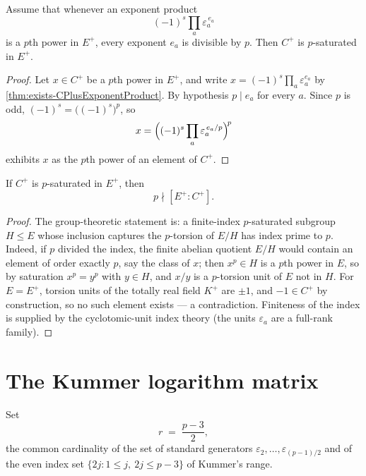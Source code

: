\begin{theorem}\label{thm:CPlus-pSaturated-exponents}
  \leanok
Assume that whenever an exponent product
\[
  (-1)^s\prod_a\varepsilon_a^{\,e_a}
\]
is a $p$th power in $E^+$, every exponent $e_a$ is divisible by $p$.  Then
$C^+$ is $p$-saturated in $E^+$.
\end{theorem}
\begin{proof}\leanok
Let $x \in C^+$ be a $p$th power in $E^+$, and write $x = (-1)^s \prod_a
\varepsilon_a^{e_a}$ by \cref{thm:exists-CPlusExponentProduct}.  By
hypothesis $p \mid e_a$ for every $a$.  Since $p$ is odd, $(-1)^s =
\bigl((-1)^s\bigr)^p$, so
\[
  x = \Bigl((-1)^s\prod_a\varepsilon_a^{\,e_a/p}\Bigr)^{\!p}
\]
exhibits $x$ as the $p$th power of an element of $C^+$.
\end{proof}

\begin{theorem}\label{thm:not-dvd-index-of-pSaturated}
  \leanok
If $C^+$ is $p$-saturated in $E^+$, then
\[
  p\nmid[E^+:C^+].
\]
\end{theorem}
\begin{proof}\leanok
The group-theoretic statement is: a finite-index $p$-saturated subgroup $H
\le E$ whose inclusion captures the $p$-torsion of $E/H$ has index prime to
$p$.  Indeed, if $p$ divided the index, the finite abelian quotient $E/H$
would contain an element of order exactly $p$, say the class of $x$; then
$x^p \in H$ is a $p$th power in $E$, so by saturation $x^p = y^p$ with
$y\in H$, and $x/y$ is a $p$-torsion unit of $E$ not in $H$.  For
$E = E^+$, torsion units of the totally real field $K^+$ are $\pm1$, and
$-1 \in C^+$ by construction, so no such element exists --- a
contradiction.  Finiteness of the index is supplied by the cyclotomic-unit
index theory (the units $\varepsilon_a$ are a full-rank family).
\end{proof}

\section{The Kummer logarithm matrix}

\begin{definition}\label{def:kummerLogRank}
  \leanok
Set
\[
  r \;=\; \frac{p-3}{2},
\]
the common cardinality of the set of standard generators
$\varepsilon_2,\ldots,\varepsilon_{(p-1)/2}$ and of the even index set
$\{2j : 1 \le j,\ 2j \le p-3\}$ of Kummer's range.
\end{definition}

